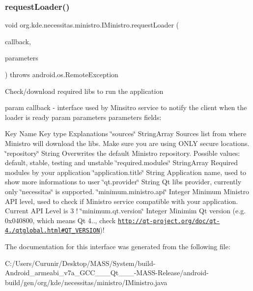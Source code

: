 \subsubsection{\texorpdfstring{request\+Loader()}{requestLoader()}}
{\footnotesize\ttfamily void org.\+kde.\+necessitas.\+ministro.\+I\+Ministro.\+request\+Loader (\begin{DoxyParamCaption}\item[{\hyperlink{interfaceorg_1_1kde_1_1necessitas_1_1ministro_1_1_i_ministro_callback}{org.\+kde.\+necessitas.\+ministro.\+I\+Ministro\+Callback}}]{callback,  }\item[{android.\+os.\+Bundle}]{parameters }\end{DoxyParamCaption}) throws android.\+os.\+Remote\+Exception}

Check/download required libs to run the application

param callback -\/ interface used by Minsitro service to notify the client when the loader is ready param parameters parameters fields\+:
\begin{DoxyItemize}
\item Key Name Key type Explanations \char`\"{}sources\char`\"{} String\+Array Sources list from where Ministro will download the libs. Make sure you are using O\+N\+LY secure locations. \char`\"{}repository\char`\"{} String Overwrites the default Ministro repository. Possible values\+: default, stable, testing and unstable \char`\"{}required.\+modules\char`\"{} String\+Array Required modules by your application \char`\"{}application.\+title\char`\"{} String Application name, used to show more informations to user \char`\"{}qt.\+provider\char`\"{} String Qt libs provider, currently only \char`\"{}necessitas\char`\"{} is supported. \char`\"{}minimum.\+ministro.\+api\char`\"{} Integer Minimum Ministro A\+PI level, used to check if Ministro service compatible with your application. Current A\+PI Level is 3 ! \char`\"{}minimum.\+qt.\+version\char`\"{} Integer Minimim Qt version (e.\+g. 0x040800, which means Qt 4.., check \href{http://qt-project.org/doc/qt-4.8/qtglobal.html#QT_VERSION}{\tt http\+://qt-\/project.\+org/doc/qt-\/4./qtglobal.\+html\#\+Q\+T\+\_\+\+V\+E\+R\+S\+I\+ON})! 
\end{DoxyItemize}

The documentation for this interface was generated from the following file\+:\begin{DoxyCompactItemize}
\item 
C\+:/\+Users/\+Curunir/\+Desktop/\+M\+A\+S\+S/\+System/build-\/\+Android\+\_\+armeabi\+\_\+v7a\+\_\+\+G\+C\+C\+\_\+\_\+\_\+\+Qt\+\_\+\_\+\_-\/\+M\+A\+S\+S-\/\+Release/android-\/build/gen/org/kde/necessitas/ministro/I\+Ministro.\+java\end{DoxyCompactItemize}
